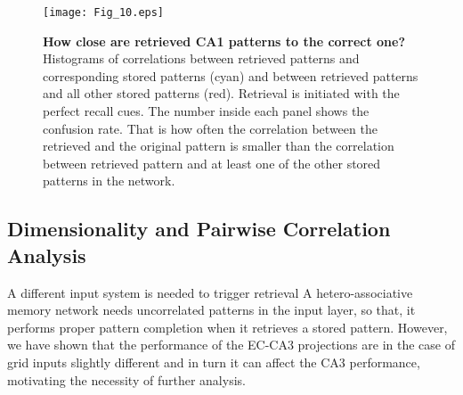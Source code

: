 \documentclass[utf8]{frontiersSCNS} %
\begin{document}
\begin{figure}[!htb]
\centering\texttt{[image: Fig\_10.eps]}
\caption{\textbf{How close are retrieved CA1 patterns to the correct one?} Histograms of correlations between retrieved patterns and corresponding stored patterns (cyan) and between retrieved patterns and all other stored patterns (red). Retrieval is initiated with the perfect recall cues. The number inside each panel shows the confusion rate. That is how often the correlation between the retrieved and the original pattern is smaller than the correlation between retrieved pattern and at least one of the other stored patterns in the network.} 
\label{Fig_10}
\end{figure}


\subsection{Dimensionality and Pairwise Correlation Analysis}

A different input system is needed to trigger retrieval
A hetero-associative memory network needs uncorrelated patterns in the input layer, so that, it performs proper pattern completion when it retrieves a stored pattern.
However, we have shown that the performance of the EC-CA3 projections are in the case of grid inputs slightly different and in turn it can affect the CA3 performance, motivating the necessity of further analysis. 



\end{document}
